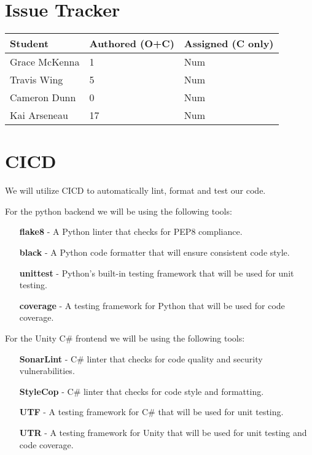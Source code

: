 \documentclass{article}
\begin{document}

\section{Issue Tracker}


\begin{table}[H]
\centering
\begin{tabular}{lll}
\toprule
\textbf{Student} & \textbf{Authored (O+C)} & \textbf{Assigned (C only)}\\
\midrule
Grace McKenna & 1 & Num \\
Travis Wing & 5 & Num \\
Cameron Dunn & 0 & Num \\
Kai Arseneau & 17 & Num \\
\bottomrule
\end{tabular}
\end{table}


\section{CICD}

We will utilize CICD to automatically lint, format and test our code. 

For the python backend we will be using the following tools:
\begin{itemize}
  \item [\textbf{flake8}] - A Python linter that checks for PEP8 compliance.
  \item [\textbf{black}] - A Python code formatter that will ensure consistent code style.
  \item [\textbf{unittest}] - Python's built-in testing framework that will be used for unit testing.
  \item [\textbf{coverage}] - A testing framework for Python that will be used for code coverage.
\end{itemize}

\bigskip
\noindent For the Unity C\# frontend we will be using the following tools:
\begin{itemize}
  \item [\textbf{SonarLint}] - C\# linter that checks for code quality and security vulnerabilities.
  \item [\textbf{StyleCop}] - C\# linter that checks for code style and formatting.
  \item [\textbf{UTF}] - A testing framework for C\# that will be used for unit testing.
  \item [\textbf{UTR}] - A testing framework for Unity that will be used for unit testing and code coverage.
\end{itemize}
\end{document}
